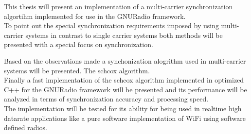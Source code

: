 This thesis will present an implementation of a multi-carrier
synchronization algortihm implemented for use in the GNURadio
framework. \\

To point out the special synchronization requirements
imposed by using multi-carrier systems in contrast
to single carrier systems both methods will be presented
with a special focus on synchronization.

Based on the observations made a synchonization alogrithm
used in multi-carrier systems will be presented.
The \gls{schcox} algorithm. \\

Finally a fast implementation of the \gls{schcox} algorithm
implemented in optimized C++ for the GNURadio framework
will be presented and its performance will be analyzed
in terms of synchronization accuracy and processing speed. \\

The implementation will be tested for its ability
for being used in realtime high datarate applications
like a pure software implementation of WiFi using
software defined radios.
